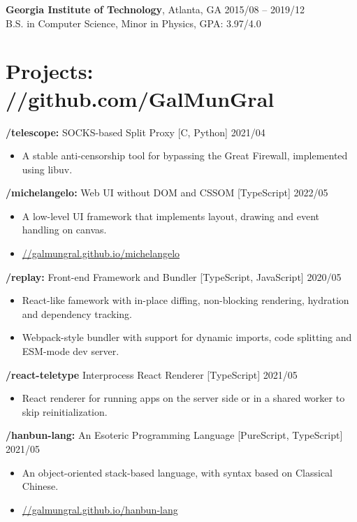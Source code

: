 \documentclass[10pt]{article}
\begin{document}
\textbf{Georgia Institute of Technology}, Atlanta, GA  \hfill 2015/08 -- 2019/12\\
B.S. in Computer Science, Minor in Physics, GPA: 3.97/4.0

\section*{Projects: //github.com/GalMunGral}

\textbf{/telescope:} SOCKS-based Split Proxy [C, Python]   \hfill 2021/04
\begin{itemize}
\item A stable anti-censorship tool for bypassing the Great Firewall, implemented using libuv.
\end{itemize}

\vspace{0.5em}
\textbf{/michelangelo:} Web UI without DOM and CSSOM [TypeScript] \hfill 2022/05
\begin{itemize}
\item A low-level UI framework that implements layout, drawing and event handling on canvas.
\item \underline{//galmungral.github.io/michelangelo}
\end{itemize}

\vspace{0.5em}
\textbf{/replay:}  Front-end Framework and Bundler [TypeScript, JavaScript] \hfill 2020/05
\begin{itemize}
\item React-like famework with in-place diffing, non-blocking rendering, hydration and dependency tracking.
\item Webpack-style bundler with support for dynamic imports, code splitting and ESM-mode dev server.
\end{itemize}

\vspace{0.5em}
\textbf{/react-teletype} Interprocess React Renderer [TypeScript] \hfill 2021/05 
\begin{itemize}
\item React renderer for running apps on the server side or in a shared worker to skip reinitialization.
\end{itemize}

\vspace{0.5em}
\textbf{/hanbun-lang:}  An Esoteric Programming Language [PureScript, TypeScript] \hfill 2021/05
\begin{itemize}
\item An object-oriented stack-based language, with syntax based on Classical Chinese.
\item \underline{//galmungral.github.io/hanbun-lang}
\end{itemize}
\end{document}

